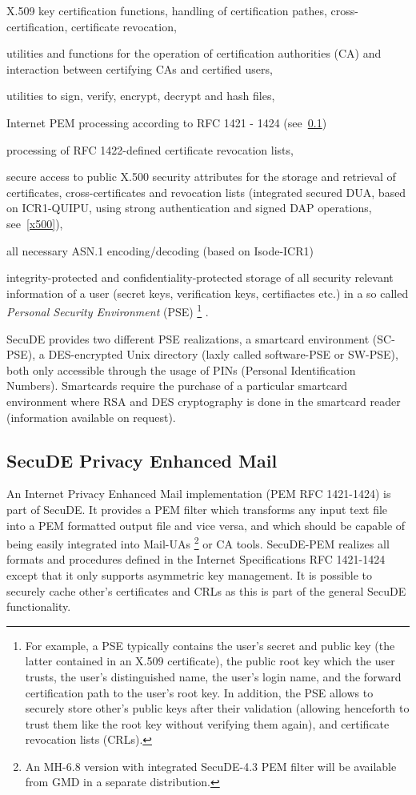 \m X.509 key certification functions, handling of certification pathes, 
   cross-certification, certificate revocation,

\m utilities and functions for the operation of certification authorities 
   (CA) and interaction between certifying CAs and certified users,

\m utilities to sign, verify, encrypt, decrypt and hash files,

\m Internet PEM processing according to RFC 1421 - 1424 (see~\ref{pem})

\m processing of RFC 1422-defined certificate revocation lists,

\m secure access to public X.500 security attributes for the storage 
   and retrieval of certificates, cross-certificates and revocation 
   lists (integrated secured DUA, based on ICR1-QUIPU, using strong 
   authentication and signed DAP operations, see~\ref{x500}),

\m all necessary ASN.1 encoding/decoding (based on Isode-ICR1)

\m integrity-protected and confidentiality-protected storage of all security 
   relevant information of a user (secret keys, verification keys, certifiactes
   etc.) in a so called {\em Personal Security Environment} (PSE)
\footnote{
For example, a PSE typically contains the user's secret and public key (the latter
contained in an X.509 certificate), the public root key which the user
trusts, the user's distinguished name, the user's login name, and the 
forward certification path to the user's root key. In addition, the PSE 
allows to securely store other's public keys after their validation 
(allowing henceforth to trust them like the root key without verifying 
them again), and certificate revocation lists (CRLs).}
.
\ei
 
SecuDE provides two different PSE realizations,
\bi 
\m a smartcard environment (SC-PSE), 
\m a DES-encrypted Unix directory (laxly called software-PSE or SW-PSE),
\ei 
both only accessible through the usage of PINs (Personal Identification Numbers).
Smartcards require the purchase of a particular smartcard environment where 
RSA and DES cryptography is done in the smartcard reader (information available 
on request).

\subsection{SecuDE Privacy Enhanced Mail}
\label{pem}
An Internet Privacy Enhanced Mail implementation (PEM RFC 1421-1424) 
is part of SecuDE. It provides a PEM filter
which transforms any input text file into a PEM formatted output file 
and vice versa, and which should be capable of being  easily 
integrated into Mail-UAs \footnote{An MH-6.8 version with integrated 
SecuDE-4.3 PEM filter will be available from GMD
in a separate distribution.}
or CA tools. SecuDE-PEM realizes all formats 
and procedures defined in the Internet Specifications RFC 1421-1424 
except that it only supports asymmetric key management. It is
possible to securely cache other's certificates and CRLs as this 
is part of the general SecuDE functionality.

